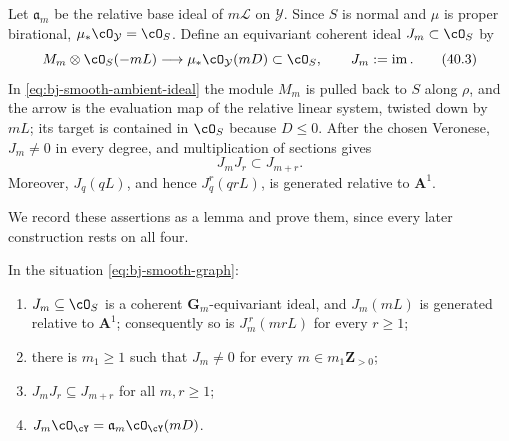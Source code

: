 Let $\mathfrak a_m$ be the relative base ideal of $m\mathcal L$ on
$\mathcal Y$.  Since $S$ is normal and $\mu$ is proper birational,
$\mu_*\cO_{\mathcal Y}=\cO_S$.  Define an equivariant coherent ideal
$J_m\subset\cO_S$ by
\[
 M_m\otimes\cO_S(-mL)\longrightarrow
 \mu_*\cO_{\mathcal Y}(mD)\subset\cO_S,\qquad
 J_m:=\operatorname{im}.
\tag{40.3}\label{eq:bj-smooth-ambient-ideal}
\]
In \eqref{eq:bj-smooth-ambient-ideal} the module $M_m$ is pulled back to
$S$ along $\rho$, and the arrow is the evaluation map of the relative
linear system, twisted down by $mL$; its target is contained in
$\cO_S$ because $D\le0$.
After the chosen Veronese, $J_m\ne0$ in every degree, and multiplication
of sections gives
\[
                            J_mJ_r\subset J_{m+r}.
\tag{40.4}\label{eq:bj-smooth-graded-ideals}
\]
Moreover, $J_q(qL)$, and hence $J_q^r(qrL)$, is generated relative to
$\mathbf A^1$.

We record these assertions as a lemma and prove them, since every later
construction rests on all four.

\begin{lemma}
\label{lem:ch40-J-basic}
In the situation \eqref{eq:bj-smooth-graph}:
\begin{enumerate}
\item\label{itm:ch40-J:coherent}
 $J_m\subseteq\cO_S$ is a coherent $\mathbf G_m$-equivariant ideal, and
 $J_m(mL)$ is generated relative to $\mathbf A^1$; consequently so is
 $J_m^{\,r}(mrL)$ for every $r\ge1$;
\item\label{itm:ch40-J:nonzero}
 there is $m_1\ge1$ such that $J_m\ne0$ for every $m\in m_1\mathbf Z_{>0}$;
\item\label{itm:ch40-J:graded}
 $J_mJ_r\subseteq J_{m+r}$ for all $m,r\ge1$;
\item\label{itm:ch40-J:pullback}
 $J_m\cO_{\cY}=\mathfrak a_m\cO_{\cY}(mD)$.
\end{enumerate}
\end{lemma}

